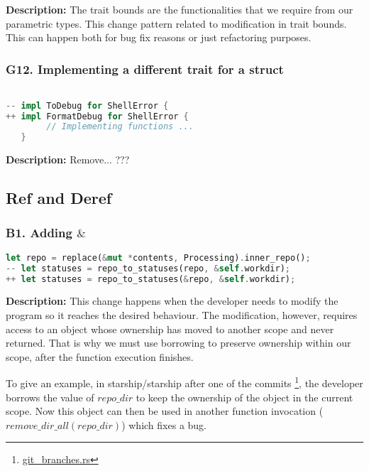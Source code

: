\noindent \textbf{Description:} The trait bounds are the functionalities that we require from our parametric types. This change pattern related to modification in trait bounds. This can happen both for bug fix reasons or just refactoring purposes.

\subsubsection{G12. Implementing a different trait for a struct}

\begin{lstlisting}[language=Rust, style=colouredRust, label={l3}]

-- impl ToDebug for ShellError {
++ impl FormatDebug for ShellError {
        // Implementing functions ...
   }

\end{lstlisting}

\noindent \textbf{Description:} Remove... ???

\subsection{Ref and Deref}
\subsubsection{B1. Adding $\&$}

\begin{lstlisting}[language=Rust, style=colouredRust, label={l3}]
let repo = replace(&mut *contents, Processing).inner_repo();
-- let statuses = repo_to_statuses(repo, &self.workdir);
++ let statuses = repo_to_statuses(&repo, &self.workdir);
\end{lstlisting}

\noindent \textbf{Description:} This change happens when the developer needs to modify the program so it reaches the desired behaviour. The modification, however, requires access to an object whose ownership has moved to another scope and never returned. That is why we must use borrowing to preserve ownership within our scope, after the function execution finishes.

To give an example, in starship/starship after one of the commits \footnote{\href{https://github.com/starship/starship/commit/56d475578ea508631275772127f49a6949fea6b0}{git_branches.rs}}, the developer borrows the value of $repo\_dir$ to keep the ownership of the object in the current scope. Now this object can then be used in another function invocation ($remove\_dir\_all(repo\_dir)$) which fixes a bug.

